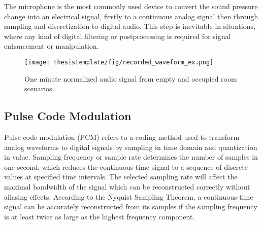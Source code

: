 

The microphone is the most commonly used device to convert the sound pressure change into an electrical signal, firstly to a continuous analog signal then through sampling and discretization to digital audio. This step is inevitable in situations, where any kind of digital filtering or postprocessing is required for signal enhancement or manipulation.


\begin{figure}[ht!]
  \begin{center}
    \texttt{[image: thesistemplate/fig/recorded\_waveform\_ex.png]}
    \caption{One minute normalized audio signal from empty and occupied room scenarios.}
    \label{fig:raw_aud_plot}
  \end{center}
\end{figure}


\subsection{Pulse Code Modulation}

Pulse code modulation (PCM) refers to a coding method used to transform analog waveforms to digital signals by sampling in time domain and quantization in value. Sampling frequency or sample rate determines the number of samples in one second, which reduces the continuous-time signal to a sequence of discrete values at specified time intervals. The selected sampling rate will affect the maximal bandwidth of the signal which can be reconstructed correctly without aliasing effects. According to the Nyquist Sampling Theorem, a continuous-time signal can be accurately reconstructed from its samples if the sampling frequency is at least twice as large as the highest frequency component.

